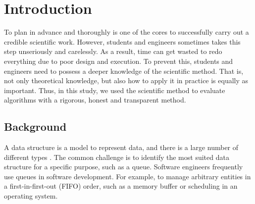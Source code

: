 \documentclass[a4paper,11pt]{kth-mag}
\begin{document}

\chapter{Introduction}
To plan in advance and thoroughly is one of the cores to successfully carry out a credible scientific work.
However, students and engineers sometimes takes this step unseriously and carelessly.
As a result, time can get wasted to redo everything due to poor design and execution.
To prevent this, students and engineers need to possess a deeper knowledge of the scientific method.
That is, not only theoretical knowledge, but also how to apply it in practice is equally as important.
Thus, in this study, we used the scientific method to evaluate algorithms with a rigorous, honest and transparent method.

\section{Background}
A data structure is a model to represent data, and there is a large number of different types \cite{deshpande2004c}.
The common challenge is to identify the most suited data structure for a specific purpose, such as a queue.
Software engineers frequently use queues in software development.
For example, to manage arbitrary entities in a first-in-first-out (FIFO) order, such as a memory buffer or scheduling in an operating system.
\end{document}
